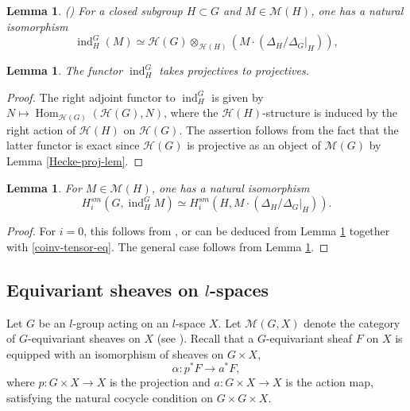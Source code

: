 \documentclass[12pt,reqno]{amsart}
\newtheorem{lemma}[theorem]{Lemma}
\theoremstyle{definition}
\theoremstyle{remark}
\numberwithin{equation}{section}
\newcommand{\ind}{\operatorname{ind}}
\newcommand{\De}{\Delta}
\newcommand{\ot}{\otimes}
\newcommand{\Hom}{\operatorname{Hom}}
\newcommand{\HH}{{\mathcal H}}
\newcommand{\MM}{{\mathcal M}}
\newcommand{\sub}{\subset}
\renewcommand{\a}{\alpha}
\begin{document}
\begin{lemma}\label{ind-tensor-lem}(\cite[Thm.\ 1.4]{Cartier})
For a closed subgroup $H\sub G$ and $M\in \MM(H)$, one has a natural isomorphism
$$\ind_H^G(M)\simeq \HH(G)\ot_{\HH(H)} (M\cdot (\De_H/\De_G|_H)),$$
\end{lemma}


\begin{lemma}\label{ind-proj-lem}
The functor $\ind_H^G$ takes projectives to projectives.
\end{lemma}

\begin{proof} The right adjoint functor to $\ind_H^G$ is given by
$N\mapsto \Hom_{\HH(G)}(\HH(G),N)$, where the $\HH(H)$-structure is induced by the right action of $\HH(H)$ on $\HH(G)$.
The assertion follows from the fact that the latter functor is exact since $\HH(G)$ is projective as an object of $\MM(G)$ by Lemma \ref{Hecke-proj-lem}.
\end{proof}

\begin{lemma}\label{hom-ind-rep-lem}
For $M\in \MM(H)$, one has a natural isomorphism
$$H^{sm}_i(G,\ind_H^G M)\simeq H^{sm}_i(H,M\cdot (\De_H/\De_G|_H)).$$
\end{lemma}

\begin{proof}
For $i=0$, this follows from \cite[Prop.\ 2.29]{BZ}, or can be deduced from Lemma \ref{ind-tensor-lem} together with \eqref{coinv-tensor-eq}. 
The general case follows from Lemma \ref{ind-proj-lem}.
\end{proof}

\subsection{Equivariant sheaves on $l$-spaces}\label{G-eq-sheaves-sec}

Let $G$ be an $l$-group acting on an $l$-space $X$. Let $\MM(G,X)$ denote the category of $G$-equivariant sheaves on $X$
(see \cite[Sec.\ 1.3]{Bern}). Recall that a $G$-equivariant sheaf $F$ on $X$ is equipped with an isomorphism of sheaves on $G\times X$,
$$\a:p^*F\to a^*F,$$
where $p:G\times X\to X$ is the projection and $a:G\times X\to X$ is the action map, satisfying the natural cocycle condition on $G\times G\times X$.
\end{document}
